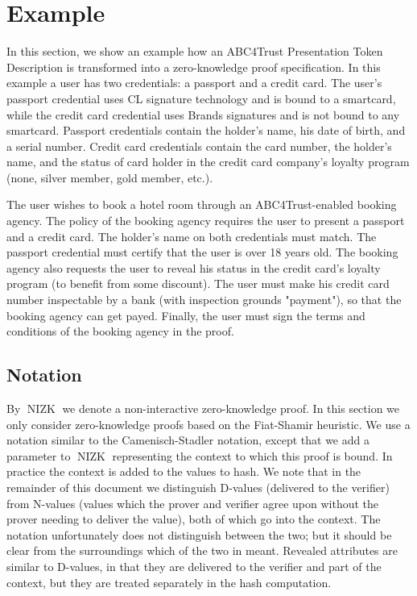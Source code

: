 
\newcommand{\NIZK}{\operatorname{NIZK}}

\section{Example}
In this section, we show an example how an ABC4Trust Presentation
Token Description is transformed into a zero-knowledge proof specification.
%
In this example a user has two credentials: a passport and a credit card.
The user's passport credential uses CL signature technology and is bound to a smartcard,
while the credit card credential uses Brands signatures and is not bound to any smartcard.
%
Passport credentials contain the holder's name, his date of birth, and a serial number.
Credit card credentials contain the card number, the holder's name, and the status of card holder in the
credit card company's loyalty program (none, silver member, gold member, etc.).


The user wishes to book a hotel room through an ABC4Trust-enabled booking agency.
The policy of the booking agency requires the user to present a passport and a credit card.
The holder's name on both credentials must match. The passport credential must certify that
the user is over 18 years old. The booking agency also requests the user to reveal his status in
the credit card's loyalty program (to benefit from some discount). The user must
make his credit card number inspectable by a bank (with inspection grounds "payment"),
so that the booking agency can get payed. Finally, the user must sign the terms and conditions of
the booking agency in the proof.

\subsection{Notation}
By $\NIZK$ we denote a non-interactive zero-knowledge proof. In this section we only consider
zero-knowledge proofs based on the Fiat-Shamir heuristic.
We use a notation similar to the Camenisch-Stadler notation, except that we add a parameter
to $\NIZK$ representing the context to which this proof is bound. In practice the context is added to the
values to hash.
We note that in the remainder of this document we distinguish D-values (delivered to the verifier)
from N-values (values which the prover and verifier agree upon without the prover needing to
deliver the value), both of which go into the context. The notation unfortunately does not
distinguish between the two; but it should be clear from the surroundings which of the two in meant.
Revealed attributes are similar to D-values, in that they are delivered to the verifier and
part of the context, but they are treated separately in the hash computation.


